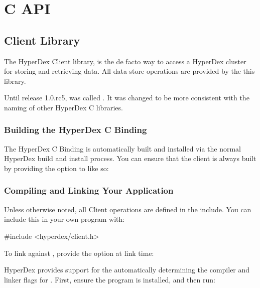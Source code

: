 \chapter{C API}

\section{Client Library}

The HyperDex Client library,  is the de facto way to
access a HyperDex cluster for storing and retrieving data.  All data-store
operations are provided by the this library.

Until release 1.0.rc5,  was called
.  It was changed to be more consistent with the naming of
other HyperDex C libraries.

\subsection{Building the HyperDex C Binding}

The HyperDex C Binding is automatically built and installed via the normal
HyperDex build and install process.  You can ensure that the client is always
built by providing the  option to  like
so:

\begin{consolecode}
\end{consolecode}

\subsection{Compiling and Linking Your Application}
Unless otherwise noted, all Client operations are defined in the
 include.  You can include this in your own program
with:

\begin{ccode}
#include <hyperdex/client.h>
\end{ccode}

To link against , provide the 
option at link time:

\begin{consolecode}
\end{consolecode}

HyperDex provides support for the automatically determining the compiler and
linker flags for .  First, ensure the 
program is installed, and then run:

